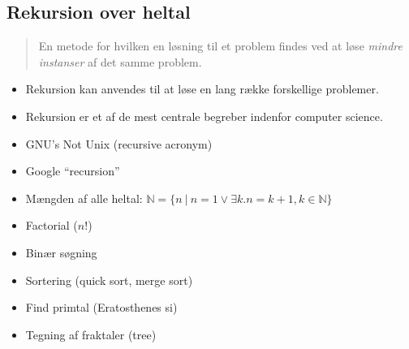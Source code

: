\documentclass[rgb]{beamer}
\begin{document}
\popmaketitleframe

\subsection{Rekursion over heltal}

\begin{frame}[fragile]
\begin{footnotesize}


  \begin{quote}
    En metode for hvilken en løsning til et problem findes ved at løse
    \emph{mindre instanser} af det samme problem.
  \end{quote}

  \begin{itemize}
  \item Rekursion kan anvendes til at løse en lang række forskellige problemer.

  \item Rekursion er et af de mest centrale begreber indenfor computer science.
  \end{itemize}

  \begin{minipage}[b]{0.6\textwidth}
  \begin{itemize}
  \item GNU's Not Unix (recursive acronym)
  \item Google ``recursion''
  \item Mængden af alle heltal: $\mathbb{N} = \{ n ~|~ n = 1 \vee \exists k. n = k + 1, k \in \mathbb{N} \}$
  \item Factorial ($n!$)
  \item Binær søgning
  \item Sortering (quick sort, merge sort)
  \item Find primtal (Eratosthenes si)
  \item Tegning af fraktaler (tree)
  \end{itemize}
\end{minipage}  \begin{minipage}[b]{0.3\textwidth}


\end{minipage}
\end{footnotesize}
\end{frame}
\end{document}
